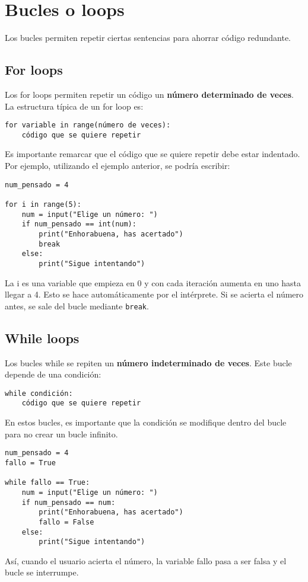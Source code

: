 \section{Bucles o loops}
Los bucles permiten repetir ciertas sentencias para ahorrar código redundante. 

\subsection{For loops}
Los for loops permiten repetir un código un \textbf{número determinado de veces}. La estructura típica de un for loop es:

\begin{lstlisting}
for variable in range(número de veces):
	código que se quiere repetir
\end{lstlisting}

Es importante remarcar que el código que se quiere repetir debe estar indentado. Por ejemplo, utilizando el ejemplo anterior, se podría escribir:

\begin{lstlisting}
num_pensado = 4

for i in range(5):
	num = input("Elige un número: ")
	if num_pensado == int(num):
		print("Enhorabuena, has acertado")
		break
	else:
		print("Sigue intentando")
\end{lstlisting}

La i es una variable que empieza en 0 y con cada iteración aumenta en uno hasta llegar a 4. Esto se hace automáticamente por el intérprete. Si se acierta el número antes, se sale del bucle mediante \texttt{break}.

\subsection{While loops}
Los bucles while se repiten un \textbf{número indeterminado de veces}. Este bucle depende de una condición:

\begin{lstlisting}
while condición:
	código que se quiere repetir
\end{lstlisting}

En estos bucles, es importante que la condición se modifique dentro del bucle para no crear un bucle infinito. 

\begin{lstlisting}
num_pensado = 4
fallo = True

while fallo == True:
	num = input("Elige un número: ")
	if num_pensado == num:
		print("Enhorabuena, has acertado")
		fallo = False
	else:
		print("Sigue intentando")
\end{lstlisting}
Así, cuando el usuario acierta el número, la variable fallo pasa a ser falsa y el bucle se interrumpe.